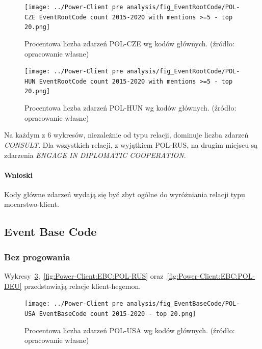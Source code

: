 \documentclass[11pt]{report}
\begin{document}
    \begin{figure}[!htp]
        \centering
        \texttt{[image: ../Power-Client pre analysis/fig\_EventRootCode/POL-CZE EventRootCode count 2015-2020 with mentions >=5 - top 20.png]}
        \caption{Procentowa liczba zdarzeń POL-CZE wg kodów głównych. (źródło: opracowanie własne)}
        \label{fig:Power-Client:ERC:Mentions:POL-CZE}
    \end{figure}

    \begin{figure}[!htp]
        \centering
        \texttt{[image: ../Power-Client pre analysis/fig\_EventRootCode/POL-HUN EventRootCode count 2015-2020 with mentions >=5 - top 20.png]}
        \caption{Procentowa liczba zdarzeń POL-HUN wg kodów głównych. (źródło: opracowanie własne)}
        \label{fig:Power-Client:ERC:Mentions:POL-HUN}
    \end{figure}

    Na każdym z 6 wykresów, niezależnie od typu relacji, dominuje liczba zdarzeń \textit{CONSULT}.
    Dla wszystkich relacji, z wyjątkiem POL-RUS, na drugim miejscu są zdarzenia \textit{ENGAGE IN DIPLOMATIC COOPERATION}.

    \paragraph{Wnioski}
    Kody główne zdarzeń wydają się być zbyt ogólne do wyróżniania relacji typu mocarstwo-klient.

    \subsection{Event Base Code}\label{subsec:event-base-code}

    \subsubsection{Bez progowania}
    Wykresy~\ref{fig:Power-Client:EBC:POL-USA},~\ref{fig:Power-Client:EBC:POL-RUS} oraz~\ref{fig:Power-Client:EBC:POL-DEU} przedstawiają relacje klient-hegemon.
    \begin{figure}[!htp]
        \centering
        \texttt{[image: ../Power-Client pre analysis/fig\_EventBaseCode/POL-USA EventBaseCode count 2015-2020 - top 20.png]}
        \caption{Procentowa liczba zdarzeń POL-USA wg kodów głównych. (źródło: opracowanie własne)}
        \label{fig:Power-Client:EBC:POL-USA}
    \end{figure}
\end{document}
